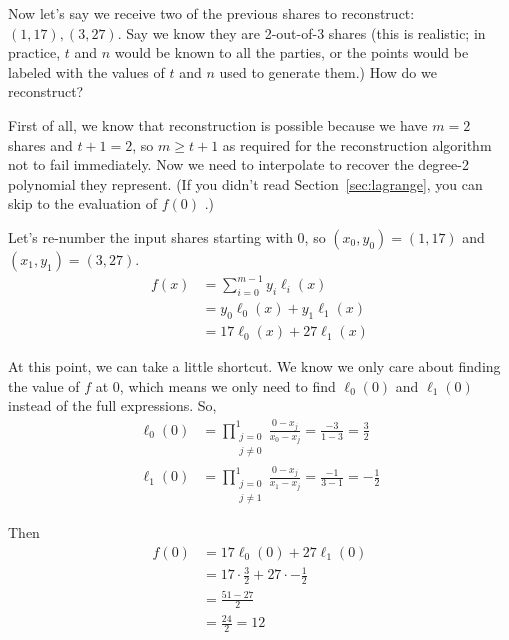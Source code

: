 \begin{example}
    Now let's say we receive two of the previous shares to reconstruct:
    $(1,17),(3,27)$. Say we know they are 2-out-of-3 shares (this is realistic; 
    in practice, $t$ and $n$ would be known to all the parties, or the 
    points would be labeled with the values of $t$ and $n$ used to 
    generate them.) How do we reconstruct?

    First of all, we know that reconstruction is possible because 
    we have $m=2$ shares and $t+1=2$, so $m \geq t+1$ as required for the 
    reconstruction algorithm not to fail immediately.
    Now we need to interpolate to recover the degree-2 polynomial 
    they represent. (If you didn't read Section~\ref{sec:lagrange}, 
    you can skip to the evaluation of $f(0)$ .)

    Let's re-number the input shares starting with 
    0, so $(x_0,y_0) = (1,17)$ and $(x_1,y_1) = (3,27)$.
    \begin{align*}
        f(x) &= \sum_{i=0}^{m-1} y_i \ell_i(x)\\
        &= y_0 \ell_0(x) + y_1 \ell_1(x)\\
        &= 17 \ell_0(x) + 27 \ell_1(x)
    \end{align*}

    At this point, we can take a little shortcut. We know we only 
    care about finding the value of $f$ at 0, which means we only 
    need to find $\ell_0(0)$ and $\ell_1(0)$ instead of the full 
    expressions. So,
    \begin{align*}
        \ell_0(0) &= \prod_{\substack{j=0\\j\neq 0}}^{1} \frac{0-x_j}{x_0-x_j}
        = \frac{-3}{1-3}
        = \frac{3}{2}\\
        \ell_1(0) &= \prod_{\substack{j=0\\j\neq 1}}^{1} \frac{0-x_j}{x_1-x_j}
        = \frac{-1}{3-1}
        = -\frac{1}{2}
    \end{align*}

    Then 
    \begin{align*}
        f(0) &= 17 \ell_0(0) + 27 \ell_1(0)\\
        &= 17 \cdot \frac{3}{2} + 27 \cdot -\frac{1}{2}\\
        &= \frac{51-27}{2}\\
        &= \frac{24}{2} = 12\\
    \end{align*}
\end{example}

